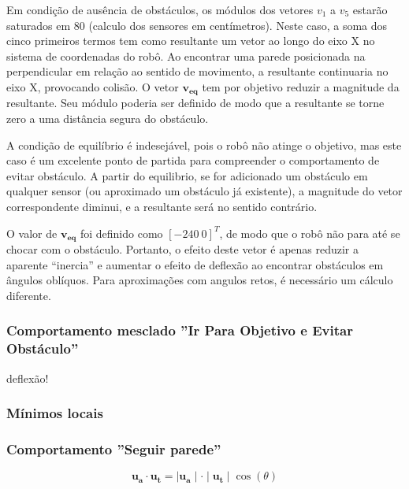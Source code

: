 		Em condição de ausência de obstáculos, os módulos dos vetores $v_1$ a $v_5$ estarão 
		saturados em 80 (calculo dos sensores em centímetros). Neste caso, a soma dos cinco 
		primeiros termos tem como resultante um vetor ao longo do eixo X no sistema de 
		coordenadas do robô. Ao encontrar uma parede posicionada na perpendicular em relação 
		ao sentido de movimento, a resultante continuaria no eixo X, provocando colisão. 
		O vetor $\mathbf{v_{eq}}$ tem por objetivo reduzir a magnitude da resultante. Seu
		módulo poderia ser definido de modo que a resultante se torne zero a uma distância 
		segura do obstáculo. 
		
		A condição de equilíbrio é indesejável, pois o robô não atinge o objetivo, mas 
		este caso é um excelente ponto de partida para compreender o comportamento
		de evitar obstáculo. A partir do equilibrio, se for adicionado um obstáculo em qualquer 
		sensor (ou aproximado um obstáculo já existente), a magnitude do vetor correspondente 
		diminui, e a resultante será no sentido contrário.
		
		O valor de $\mathbf{v_{eq}}$ foi definido como $[-240 \ 0]^T$, de modo que o robô não
		para até se chocar com o obstáculo. Portanto, o efeito deste vetor é apenas reduzir a
		aparente ``inercia'' e aumentar o efeito de deflexão ao encontrar obstáculos em ângulos
		oblíquos. Para aproximações com angulos retos, é necessário um cálculo diferente.
		
		
		
		\subsubsection{Comportamento mesclado ''Ir Para Objetivo e Evitar Obstáculo''}
		
		deflexão!
		
		\subsubsection{Mínimos locais}
		
		
		
		\subsubsection{Comportamento ''Seguir parede''}
		
		
		
		
		
		\begin{equation}
			\label{eq:vetorPerpendicularSP1}
			\mathbf{u_a} \cdot \mathbf{u_t} = \mid \mathbf{u_a} \mid \cdot \mid \mathbf{u_t} \mid \cos(\theta)
		\end{equation}
		
